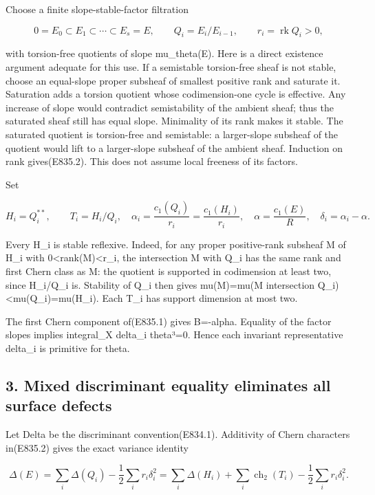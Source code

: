 Choose a finite slope-stable-factor filtration

\[
 0=E_0\subset E_1\subset\cdots\subset E_s=E,
 \qquad Q_i=E_i/E_{i-1},\qquad r_i=\operatorname{rk}Q_i>0,
 \tag{E835.2}
\]

with torsion-free quotients of slope mu\_theta(E). Here is a direct
existence argument adequate for this use. If a semistable torsion-free
sheaf is not stable, choose an equal-slope proper subsheaf of smallest
positive rank and saturate it. Saturation adds a torsion quotient whose
codimension-one cycle is effective. Any increase of slope would
contradict semistability of the ambient sheaf; thus the saturated sheaf
still has equal slope. Minimality of its rank makes it stable. The
saturated quotient is torsion-free and semistable: a larger-slope
subsheaf of the quotient would lift to a larger-slope subsheaf of the
ambient sheaf. Induction on rank gives(E835.2). This does not assume
local freeness of its factors.

Set

\[
 H_i=Q_i^{**},\qquad T_i=H_i/Q_i,
 \quad \alpha_i=\frac{c_1(Q_i)}{r_i}=\frac{c_1(H_i)}{r_i},
 \quad \alpha=\frac{c_1(E)}R,\quad\delta_i=\alpha_i-\alpha.
 \tag{E835.3}
\]

Every H\_i is stable reflexive. Indeed, for any proper positive-rank
subsheaf M of H\_i with 0\textless rank(M)\textless r\_i, the
intersection M with Q\_i has the same rank and first Chern class as M:
the quotient is supported in codimension at least two, since H\_i/Q\_i
is. Stability of Q\_i then gives mu(M)=mu(M intersection
Q\_i)\textless mu(Q\_i)=mu(H\_i). Each T\_i has support dimension at
most two.

The first Chern component of(E835.1) gives B=-alpha. Equality of the
factor slopes implies integral\_X delta\_i theta³=0. Hence each
invariant representative delta\_i is primitive for theta.

\subsection{3. Mixed discriminant equality eliminates all surface
defects}\label{SF-E835:mixed-discriminant-equality-eliminates-all-surface-defects}

Let Delta be the discriminant convention(E834.1). Additivity of Chern
characters in(E835.2) gives the exact variance identity

\[
 \Delta(E)=\sum_i\Delta(Q_i)-\frac12\sum_i r_i\delta_i^2
          =\sum_i\Delta(H_i)+\sum_i\operatorname{ch}_2(T_i)
                         -\frac12\sum_i r_i\delta_i^2.
 \tag{E835.4}
\]

